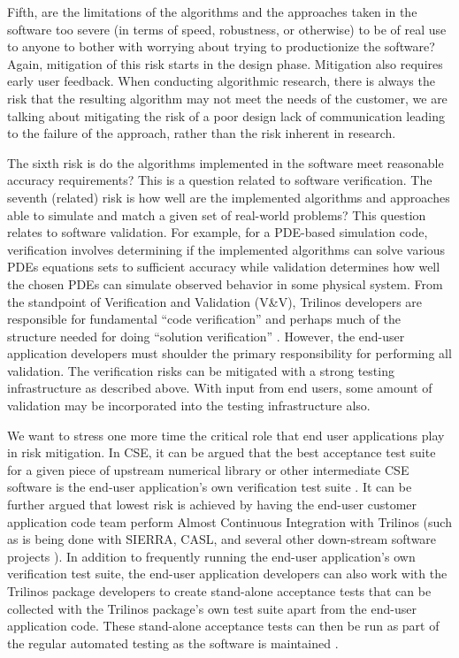 \documentclass[11pt]{SANDreport}
\begin{document}
Fifth, are the limitations of the algorithms and the approaches taken
in the software too severe (in terms of speed, robustness, or otherwise) to be
of real use to anyone to bother with worrying about trying to productionize
the software?  Again, mitigation of
this risk starts in the design phase.  Mitigation also requires early user
feedback.  When conducting algorithmic research, there is always the risk that
the resulting algorithm may not meet the needs of the customer, we are talking
about mitigating the risk of a poor design lack of communication leading to
the failure of the approach, rather than the risk inherent in research.

The sixth risk is do the algorithms implemented in the software
meet reasonable accuracy requirements?  This is a question related to software
verification.  The seventh (related) risk is how well are the implemented
algorithms and approaches able to simulate and match a given set of
real-world problems?  This question relates to software validation.
For example, for a PDE-based simulation code, verification involves
determining if the implemented algorithms can solve various PDEs equations
sets to sufficient accuracy while validation determines how well the chosen
PDEs can simulate observed behavior in some physical system.  From the
standpoint of Verification and Validation (V\&V), Trilinos developers are
responsible for fundamental ``code verification'' and perhaps much of the
structure needed for doing ``solution verification''
{}\cite{SEVVIntersections05}.  However, the end-user application
developers must shoulder the primary responsibility for performing all
validation.  The verification risks can be mitigated with a strong testing
infrastructure as described above.  With input from end users, some amount of
validation may be incorporated into the testing infrastructure also.

We want to stress one more time the critical role that end user applications
play in risk mitigation.  In CSE, it can be
argued that the best acceptance test suite for a given piece of
upstream numerical library or other intermediate CSE software is the
end-user application's own verification test suite
{}\cite{SoftwareIntegrationforCSE09}.  It can be further argued that
lowest risk is achieved by having the end-user customer application
code team perform Almost Continuous Integration with Trilinos (such as
is being done with SIERRA, CASL, and several other down-stream
software projects {}\cite{SoftwareIntegrationforCSE09}).  In addition
to frequently running the end-user application's own verification test
suite, the end-user application developers can also work with the
Trilinos package developers to create stand-alone acceptance tests
that can be collected with the Trilinos package's own test suite apart
from the end-user application code.  These stand-alone acceptance
tests can then be run as part of the regular automated testing as the
software is maintained {}\cite{DomainDrivenDesign}.
\end{document}
